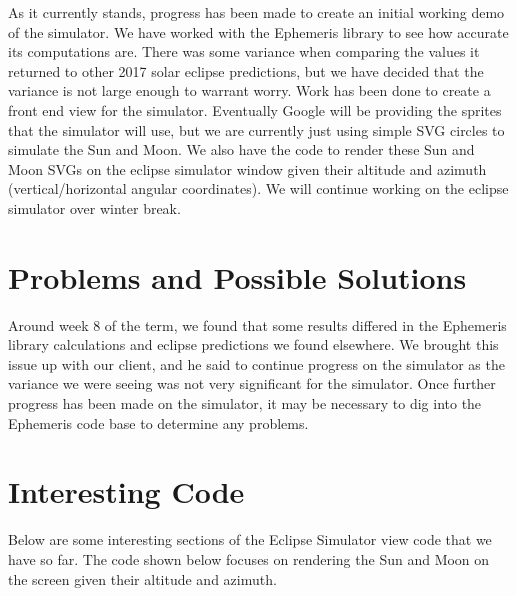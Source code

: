 \documentclass[10pt, onecolumn, draftclsnofoot, letterpaper, compsoc]{IEEEtran}
\begin{document}
As it currently stands, progress has been made to create an initial working
demo of the simulator. We have worked with the Ephemeris library to see how
accurate its computations are. There was some variance when comparing the
values it returned to other 2017 solar eclipse predictions, but we have
decided that the variance is not large enough to warrant worry. Work has
been done to create a front end view for the simulator. Eventually Google
will be providing the sprites that the simulator will use, but we are currently
just using simple SVG circles to simulate the Sun and Moon. We also have the
code to render these Sun and Moon SVGs on the eclipse simulator window given
their altitude and azimuth (vertical/horizontal angular coordinates). We will
continue working on the eclipse simulator over winter break.

\section{Problems and Possible Solutions}

Around week 8 of the term, we found that some results differed in the Ephemeris
library calculations and eclipse predictions we found elsewhere. We brought
this issue up with our client, and he said to continue progress on the
simulator as the variance we were seeing was not very significant for the
simulator. Once further progress has been made on the simulator, it may be
necessary to dig into the Ephemeris code base to determine any problems.

\section{Interesting Code}

Below are some interesting sections of the Eclipse Simulator view code that we have so far. 
The code shown below focuses on rendering the Sun and Moon on the screen given their
altitude and azimuth. \\
\end{document}
